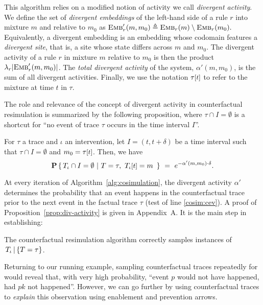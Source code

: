 This algorithm relies on a modified notion of activity we call
\emph{divergent activity}. We define the set of \emph{divergent
  embeddings} of the left-hand side of a rule $r$ into mixture $m$ and
relative to $m_0$ as
${\textsc{Emb}}'_{r}(m, m_0) \triangleq {\textsc{Emb}}_{r}(m) \setminus {\textsc{Emb}}_{r}(m_0).$
Equivalently, a divergent embedding is an embedding whose codomain
features a \emph{divergent site}, that is, a site whose state differs
across $m$ and $m_0$. The {divergent activity} of a rule $r$ in
mixture $m$ relative to $m_0$ is then the product
$\lambda_r|{\textsc{Emb}}'_{r}(m, m_0)|$. The \emph{total divergent activity} of
the system, $\alpha'(m, m_0)$, is the sum of all divergent
activities. Finally, we use the notation $\TSTATE{t}{\tau}$ to refer
to the mixture at time $t$ in $\tau$.



The role and relevance of the concept of divergent activity in
counterfactual resimulation is summarized by the following
proposition, where $\tau \cap I = \emptyset$ is a shortcut for ``no
event of trace $\tau$ occurs in the time interval $I$''.
\begin{proposition}\label{prop:div-activity}
  For $\tau$ a trace and $\iota$ an intervention, let
  $I = (t, t+\delta)$ be a time interval such that
  $\tau \cap I = \emptyset$ and $m_0 = \TSTATE{t}{\tau}$. Then, we
  have
  \[\CProb{ \ATRAJ{} \cap I = \emptyset }{ T=\tau,\
      \TSTATE{t}{\ATRAJ{}} = m\ }
    \ =\ e^{-\alpha'(m, m_0) \cdot \delta}.
  \]
\end{proposition}
\noindent At every iteration of Algorithm~\ref{alg:cosimulation}, the
divergent activity $\alpha'$ determines the probability that an event
happens in the counterfactual trace prior to the next event in the
factual trace $\tau$ (test of line \ref{cosim:cev}).  A proof of
Proposition~\ref{prop:div-activity} is given in
Appendix~A. %
It is the main step in establishing:

\begin{theorem}%
  The counterfactual resimulation algorithm correctly
  samples instances of $\,{T_\iota\,|\,\{T=\tau\}}{}$.
\end{theorem}



Returning to our running example, sampling counterfactual traces repeatedly for
\RefTrace{} would reveal that, with very high probability, ``event $p$ would not
have happened, had $pk$ not happened''. However, we can go further by using
counterfactual traces to \textit{explain} this observation using enablement and
prevention arrows.
